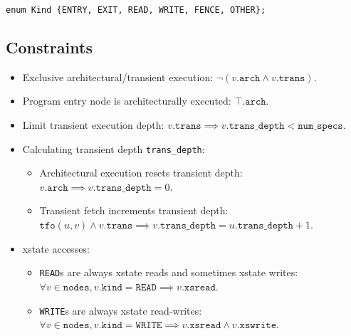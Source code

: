 \documentclass{article}
\newcommand{\kind}{\texttt{kind}}
\newcommand{\READ}{\texttt{READ}}
\newcommand{\WRITE}{\texttt{WRITE}}
\newcommand{\tfo}{\texttt{tfo}}
\newcommand{\nodes}{\texttt{nodes}}
\newcommand{\arch}{\texttt{arch}}
\newcommand{\trans}{\texttt{trans}}
\newcommand{\transdepth}{\texttt{trans\_depth}}
\newcommand{\xsread}{\texttt{xsread}}
\newcommand{\xswrite}{\texttt{xswrite}}
\newcommand{\numspecs}{\texttt{num\_specs}}
\begin{document}
\begin{verbatim}
enum Kind {ENTRY, EXIT, READ, WRITE, FENCE, OTHER};
\end{verbatim}

\subsection{Constraints}
\begin{itemize}
\item Exclusive architectural/transient execution: $\neg \left( v.\arch \wedge v.\trans \right)$.
\item Program entry node is architecturally executed: $\top.\arch$.
\item Limit transient execution depth: $v.\trans \implies v.\transdepth < \numspecs$.
\item Calculating transient depth \transdepth:
  \begin{itemize}
  \item Architectural execution resets transient depth:
    $v.\arch \implies v.\transdepth = 0$.
  \item Transient fetch increments transient depth:
    $\tfo(u,v) \wedge v.\trans \implies v.\transdepth = u.\transdepth + 1$.
  \end{itemize}
\item xstate accesses:
  \begin{itemize}
  \item \READ{}s are always xstate reads and sometimes xstate writes:
    $\forall v \in \nodes, v.\kind = \READ \implies v.\xsread$.
  \item \WRITE{}s are always xstate read-writes:
    $\forall v \in \nodes, v.\kind = \WRITE \implies v.\xsread \wedge v.\xswrite$.
  \end{itemize}
\end{itemize}
\end{document}
